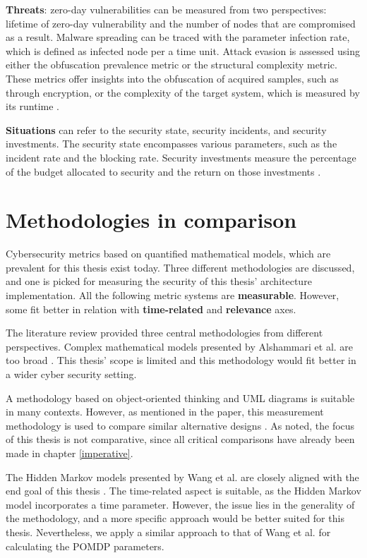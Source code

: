 \textbf{Threats}: zero-day vulnerabilities can be measured from two
perspectives: lifetime of zero-day vulnerability and the number of
nodes that are compromised as a result. Malware spreading can be
traced with the parameter infection rate, which is defined as infected
node per a time unit. Attack evasion is assessed using either the
obfuscation prevalence metric or the structural complexity
metric. These metrics offer insights into the obfuscation of acquired
samples, such as through encryption, or the complexity of the target
system, which is measured by its runtime \cite{pendleton2016survey,  ramos2017model}.

\textbf{Situations} can refer to the security state, security
incidents, and security investments. The security state encompasses
various parameters, such as the incident rate and the blocking
rate. Security investments measure the percentage
of the budget allocated to security and the return on those
investments \cite{pendleton2016survey}. 

\section{Methodologies in comparison} \label{whyqueries}

Cybersecurity metrics based on quantified
mathematical models, which are prevalent for this thesis exist today. Three
different methodologies are discussed, and one is picked for measuring
the security of this thesis' architecture implementation. All the following metric
systems are \textbf{measurable}. However, some fit better in relation with \textbf{time-related} and \textbf{relevance} axes.

The literature review provided three central methodologies from different perspectives. Complex mathematical models
presented by Alshammari et al. are too broad
\cite{alshammari2009security}. This thesis' scope is limited and this
methodology would fit better in a wider cyber security setting.

A methodology based on object-oriented thinking and UML diagrams is
suitable in many contexts. However, as mentioned in the paper, this
measurement methodology is used to compare similar alternative designs
\cite{alshammari2009security}. As noted, the focus of this thesis is
not comparative, since all critical comparisons have already been made
in chapter \ref{imperative}.

The Hidden Markov models presented by Wang et al. are closely aligned
with the end goal of this thesis \cite{wang2010framework}. The
time-related aspect is suitable, as the Hidden Markov model
incorporates a time parameter. However, the issue lies in the
generality of the methodology, and a more specific approach would be
better suited for this thesis. Nevertheless, we apply a similar
approach to that of Wang et al. for calculating the POMDP parameters.

